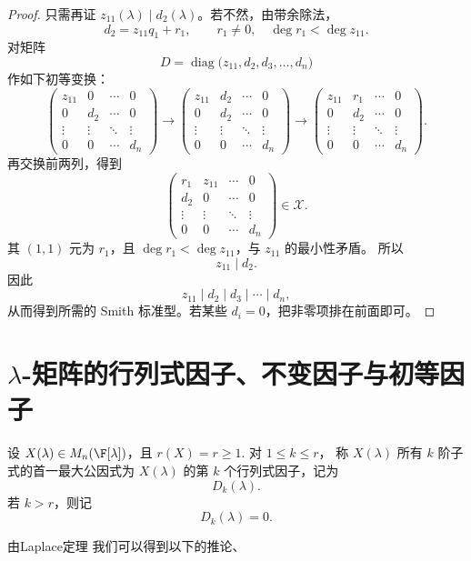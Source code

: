 \begin{proof}
	只需再证 $z_{11}(\lambda)\mid d_2(\lambda)$。若不然，由带余除法，
	\[
	d_2=z_{11}q_1+r_1,\qquad r_1\neq0,\quad \deg r_1<\deg z_{11}.
	\]
	对矩阵
	\[
	D=\operatorname{diag}\bigl(z_{11},d_2,d_3,\ldots,d_n\bigr)
	\]
	作如下初等变换：
	\[
	\begin{pmatrix}
		z_{11} & 0 & \cdots & 0\\
		0 & d_2 & \cdots & 0\\
		\vdots & \vdots & \ddots & \vdots\\
		0 & 0 & \cdots & d_n
	\end{pmatrix}
	\longrightarrow
	\begin{pmatrix}
		z_{11} & d_2 & \cdots & 0\\
		0 & d_2 & \cdots & 0\\
		\vdots & \vdots & \ddots & \vdots\\
		0 & 0 & \cdots & d_n
	\end{pmatrix}
	\longrightarrow
	\begin{pmatrix}
		z_{11} & r_1 & \cdots & 0\\
		0 & d_2 & \cdots & 0\\
		\vdots & \vdots & \ddots & \vdots\\
		0 & 0 & \cdots & d_n
	\end{pmatrix}.
	\]
	再交换前两列，得到
	\[
	\begin{pmatrix}
		r_1 & z_{11} & \cdots & 0\\
		d_2 & 0 & \cdots & 0\\
		\vdots & \vdots & \ddots & \vdots\\
		0 & 0 & \cdots & d_n
	\end{pmatrix}\in\mathcal X.
	\]
	其 $(1,1)$ 元为 $r_1$，且 $\deg r_1<\deg z_{11}$，与 $z_{11}$ 的最小性矛盾。
	所以
	\[
	z_{11}\mid d_2.
	\]
	因此
	\[
	z_{11}\mid d_2\mid d_3\mid\cdots\mid d_n,
	\]
	从而得到所需的 Smith 标准型。若某些 $d_i=0$，把非零项排在前面即可。
\end{proof}
\section{$\lambda$-矩阵的行列式因子、不变因子与初等因子}


\begin{definition}\label{p1:concept:c5-l2205}
	
设 $X(\lambda)\in M_n(\F[\lambda])$，且 $r(X)=r\geq 1$. 对 $1\leq k\leq r$，
称 $X(\lambda)$ 所有 $k$ 阶子式的首一最大公因式为 $X(\lambda)$ 的第 $k$ 个行列式因子，记为
\[
D_k(\lambda).
\]
若 $k>r$，则记
\[
D_k(\lambda)=0.
\]

\end{definition}
由Laplace定理 我们可以得到以下的推论、


